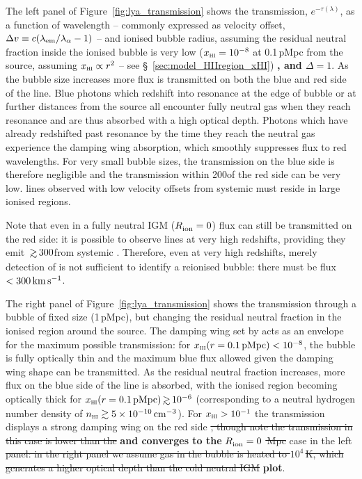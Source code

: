 \documentclass[fleqn,usenatbib]{mnras}
\providecommand{\DIFadd}[1]{{\protect\color{Green} \bf #1}} %
\providecommand{\DIFdel}[1]{{\protect\color{lightgray} \footnotesize \sout{#1}}} %
\providecommand{\DIFaddbegin}{} %
\providecommand{\DIFaddend}{} %
\providecommand{\DIFdelbegin}{} %
\providecommand{\DIFdelend}{} %
\newcommand{\DIFscaledelfig}{0.5}
\newlength{\DIFdelgraphicswidth} %
\newlength{\DIFdelgraphicsheight} %
\newcommand{\DIFaddincludegraphics}[2][]{{\color{blue}\fbox{\DIFOincludegraphics[#1]{#2}}}} %
\newcommand{\DIFdelincludegraphics}[2][]{%
\sbox{\DIFdelgraphicsbox}{\DIFOincludegraphics[#1]{#2}}%
\settoboxwidth{\DIFdelgraphicswidth}{\DIFdelgraphicsbox} %
\settoboxtotalheight{\DIFdelgraphicsheight}{\DIFdelgraphicsbox} %
\scalebox{\DIFscaledelfig}{%
\parbox[b]{\DIFdelgraphicswidth}{\usebox{\DIFdelgraphicsbox}\\[-\baselineskip] \rule{\DIFdelgraphicswidth}{0em}}\llap{\resizebox{\DIFdelgraphicswidth}{\DIFdelgraphicsheight}{%
\setlength{\unitlength}{\DIFdelgraphicswidth}%
\begin{picture}(1,1)%
\thicklines\linethickness{2pt} %
{\color[rgb]{1,0,0}\put(0,0){\framebox(1,1){}}}%
{\color[rgb]{1,0,0}\put(0,0){\line( 1,1){1}}}%
{\color[rgb]{1,0,0}\put(0,1){\line(1,-1){1}}}%
\end{picture}%
}\hspace*{3pt}}} %
} %
\DeclareRobustCommand{\DIFaddbegin}{\DIFOaddbegin \let\includegraphics\DIFaddincludegraphics} %
\DeclareRobustCommand{\DIFaddend}{\DIFOaddend \let\includegraphics\DIFOincludegraphics} %
\DeclareRobustCommand{\DIFdelbegin}{\DIFOdelbegin \let\includegraphics\DIFdelincludegraphics} %
\DeclareRobustCommand{\DIFdelend}{\DIFOaddend \let\includegraphics\DIFOincludegraphics} %
\begin{document}
The left panel of Figure~\ref{fig:lya_transmission} shows the \lya transmission, $e^{-\tau(\lambda)}$, as a function of wavelength -- commonly expressed as velocity offset, $\DV \equiv c (\lambda_\mathrm{em} / \lambda_\alpha - 1)$ -- and ionised bubble radius, assuming the residual neutral fraction inside the ionised bubble is very low ($\xHI = 10^{-8}$ at 0.1\,pMpc from the source, assuming $\xHI \propto r^2$ -- see \S~\ref{sec:model_HIIregion_xHI})\DIFaddbegin \DIFadd{, and $\Delta=1$}\DIFaddend . As the bubble size increases more flux is transmitted on both the blue and red side of the line. Blue photons which redshift into resonance at the edge of bubble or at further distances from the source all encounter fully neutral gas when they reach resonance and are thus absorbed with a high optical depth. Photons which have already redshifted past resonance by the time they reach the neutral gas experience the damping wing absorption, which smoothly suppresses flux to red wavelengths. For very small bubble sizes, the transmission on the blue side is therefore negligible and the transmission within 200\kms of the red side can be very low. \lya lines observed with low velocity offsets from systemic must reside in large ionised regions. 

Note that even in a fully neutral IGM ($\Rion = 0$) \lya flux can still be transmitted on the red side: it is possible to observe \lya lines at very high redshifts, providing they emit \lya $\simgt300$\kms from systemic \citep{Dijkstra2011}. Therefore, even at very high redshifts, merely detection of \lya is not sufficient to identify a reionised bubble: there must be flux $<300\kms$.

The right panel of Figure~\ref{fig:lya_transmission} shows the transmission through a bubble of fixed size (1\,pMpc), but changing the residual neutral fraction in the ionised region around the source. The damping wing set by \Rion acts as an envelope for the maximum possible transmission: for $\xHI(r=0.1\,\mathrm{pMpc}) < 10^{-8}$, the bubble is fully optically thin and the maximum blue flux allowed given the damping wing shape can be transmitted. As the residual neutral fraction increases, more flux on the blue side of the line is absorbed, with the ionised region becoming optically thick for $\xHI(r=0.1\,\mathrm{pMpc}) \simgt 10^{-6}$ (corresponding to a neutral hydrogen number density of $n_\HI\gtrsim 5\times10^{-10}\cm^{-3}$). For $\xHI > 10^{-1}$ the transmission displays a strong damping wing on the red side \DIFdelbegin \DIFdel{, though note the transmission in this case is lower than the }\DIFdelend \DIFaddbegin \DIFadd{and converges to the }\DIFaddend $\Rion=0$ \DIFdelbegin \DIFdel{\,Mpc }\DIFdelend case in the left \DIFdelbegin \DIFdel{panel: in the right panel we assume gas in the bubble is heated to $10^4\,$K, which generates a higher optical depth than the cold neutral IGM}\DIFdelend \DIFaddbegin \DIFadd{plot}\DIFaddend .
\end{document}
